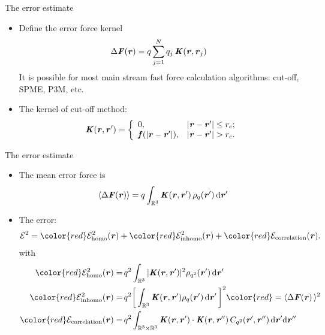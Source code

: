 \documentclass{beamer}
\newcommand{\redc}[1]{{\color{red} #1}}
\newcommand{\bluec}[1]{{\color{blue} #1}}
\newcommand{\vect}[1]{\textbf{\textit{#1}}}
\renewcommand{\d}[1]{\textrm{#1}}
\begin{document}
\begin{frame}{The error estimate}
  \begin{itemize}
  \item <1-> Define the error force kernel
    \bluec{
      \begin{align*}
        \Delta \vect F(\vect r)
        &=
        q \sum_{j=1}^N q_j \,\vect K(\vect r, \vect r_j)
      \end{align*}}
    It is possible for most main stream fast force calculation algorithms: cut-off, SPME, P3M, etc.
  \item <2-> The kernel of cut-off method:
    \bluec{
      \begin{align*}
        \vect K(\vect r,\vect r') =
        \left\{
          \begin{array}{ll}
            0, & \vert\vect r - \vect r'\vert\leq r_c; \\
            \vect f(\vert\vect r-\vect r'\vert), & \vert\vect r - \vect r'\vert > r_c.
          \end{array}
        \right.
      \end{align*}}
    \vfill
  \end{itemize}
\end{frame}

\begin{frame}{The error estimate}
  \begin{itemize}\itemsep -10pt
  \item<1->   The mean error force is
    \bluec{
      \begin{align*}
        \langle\Delta\vect F(\vect r)\rangle
        =
        q\int_{\mathbb R^3}\vect K(\vect r , \vect r')\,\rho_q(\vect r')\,\d d\vect r'
      \end{align*}
    }
  \vskip -10cm
\item<2->   The error:
  \bluec{
    \begin{align*} \nonumber
      \mathcal E^2
      = 
      \redc{\mathcal E^2_{\textrm{homo}}(\vect r)} +
      \redc{\mathcal E^2_{\textrm{inhomo}}(\vect r)} +
      \redc{\mathcal E_{\textrm{correlation}}(\vect r)}.
    \end{align*}
  }
  with\bluec{
  \begin{align*}
    \redc{\mathcal E^2_{\textrm{homo}}(\vect r)}
    = &\,
    q^2\int_{\mathbb R^3}\vert\vect K(\vect r, \vect r')\vert^2\rho_{q^2}(\vect r')\,\d d\vect r'  \\
    \redc{\mathcal E^2_{\textrm{inhomo}}(\vect r)}
    = &\,
    q^2\bigg[\int_{\mathbb R^3}\vect K(\vect r, \vect r')\rho_q(\vect r')\,\d d\vect r'\,\bigg]^2
    \redc{ = \langle\Delta\vect F(\vect r)\,\rangle^2}
    \\
    \redc{\mathcal E_{\textrm{correlation}}(\vect r)}
    =&\,
    q^2\int_{\mathbb R^3\times\mathbb R^3}\vect K(\vect r, \vect r')\cdot\vect K(\vect r, \vect r'')\,C_{q^2}(\vect r', \vect r'')\,\d d\vect r'\d d\vect r''
  \end{align*}}
  \end{itemize}
\end{frame}
\end{document}
